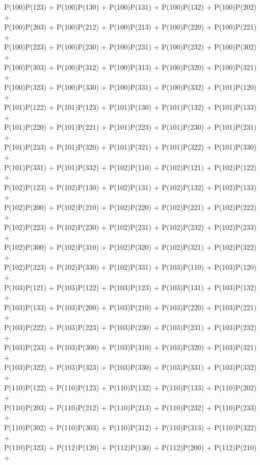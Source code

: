 P(100)P(123) + P(100)P(130) + P(100)P(131) + P(100)P(132) + P(100)P(202) +\\
P(100)P(203) + P(100)P(212) + P(100)P(213) + P(100)P(220) + P(100)P(221) +\\
P(100)P(223) + P(100)P(230) + P(100)P(231) + P(100)P(232) + P(100)P(302) +\\
P(100)P(303) + P(100)P(312) + P(100)P(313) + P(100)P(320) + P(100)P(321) +\\
P(100)P(323) + P(100)P(330) + P(100)P(331) + P(100)P(332) + P(101)P(120) +\\
P(101)P(122) + P(101)P(123) + P(101)P(130) + P(101)P(132) + P(101)P(133) +\\
P(101)P(220) + P(101)P(221) + P(101)P(223) + P(101)P(230) + P(101)P(231) +\\
P(101)P(233) + P(101)P(320) + P(101)P(321) + P(101)P(322) + P(101)P(330) +\\
P(101)P(331) + P(101)P(332) + P(102)P(110) + P(102)P(121) + P(102)P(122) +\\
P(102)P(123) + P(102)P(130) + P(102)P(131) + P(102)P(132) + P(102)P(133) +\\
P(102)P(200) + P(102)P(210) + P(102)P(220) + P(102)P(221) + P(102)P(222) +\\
P(102)P(223) + P(102)P(230) + P(102)P(231) + P(102)P(232) + P(102)P(233) +\\
P(102)P(300) + P(102)P(310) + P(102)P(320) + P(102)P(321) + P(102)P(322) +\\
P(102)P(323) + P(102)P(330) + P(102)P(331) + P(103)P(110) + P(103)P(120) +\\
P(103)P(121) + P(103)P(122) + P(103)P(123) + P(103)P(131) + P(103)P(132) +\\
P(103)P(133) + P(103)P(200) + P(103)P(210) + P(103)P(220) + P(103)P(221) +\\
P(103)P(222) + P(103)P(223) + P(103)P(230) + P(103)P(231) + P(103)P(232) +\\
P(103)P(233) + P(103)P(300) + P(103)P(310) + P(103)P(320) + P(103)P(321) +\\
P(103)P(322) + P(103)P(323) + P(103)P(330) + P(103)P(331) + P(103)P(332) +\\
P(110)P(122) + P(110)P(123) + P(110)P(132) + P(110)P(133) + P(110)P(202) +\\
P(110)P(203) + P(110)P(212) + P(110)P(213) + P(110)P(232) + P(110)P(233) +\\
P(110)P(302) + P(110)P(303) + P(110)P(312) + P(110)P(313) + P(110)P(322) +\\
P(110)P(323) + P(112)P(120) + P(112)P(130) + P(112)P(200) + P(112)P(210) +\\
